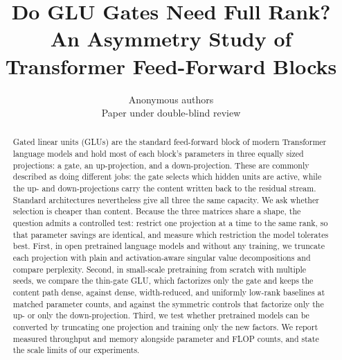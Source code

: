 \documentclass{article}
\title{Do GLU Gates Need Full Rank? An Asymmetry Study of Transformer Feed-Forward Blocks}
\author{Anonymous authors \\ Paper under double-blind review}
\begin{document}
\maketitle

\begin{abstract}
Gated linear units (GLUs) are the standard feed-forward block of modern Transformer language models and
hold most of each block's parameters in three equally sized projections: a gate, an up-projection, and a
down-projection. These are commonly described as doing different jobs: the gate selects which hidden
units are active, while the up- and down-projections carry the content written back to the residual
stream. Standard architectures nevertheless give all three the same capacity. We ask whether selection
is cheaper than content. Because the three matrices share a shape, the question admits a controlled
test: restrict one projection at a time to the same rank, so that parameter savings are identical, and
measure which restriction the model tolerates best. First, in open pretrained language models and
without any training, we truncate each projection with plain and activation-aware singular value
decompositions and compare perplexity. Second, in small-scale pretraining from scratch with multiple
seeds, we compare the thin-gate GLU, which factorizes only the gate and keeps the content path dense,
against dense, width-reduced, and uniformly low-rank baselines at matched parameter counts, and against
the symmetric controls that factorize only the up- or only the down-projection. Third, we test whether
pretrained models can be converted by truncating one projection and training only the new factors. We
report measured throughput and memory alongside parameter and FLOP counts, and state the scale limits of
our experiments.
\end{abstract}
\end{document}
